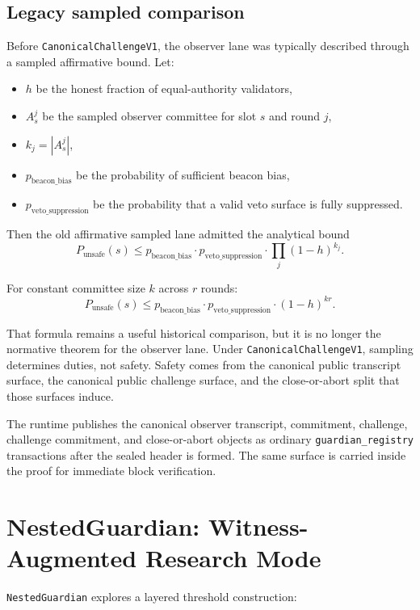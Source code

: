 \documentclass[11pt]{article}
\newcommand{\code}[1]{\texttt{#1}}
\begin{document}
\subsection{Legacy sampled comparison}

Before \code{CanonicalChallengeV1}, the observer lane was typically described
through a sampled affirmative bound. Let:

\begin{itemize}[leftmargin=1.5em]
\item \(h\) be the honest fraction of equal-authority validators,
\item \(A_s^j\) be the sampled observer committee for slot \(s\) and round
\(j\),
\item \(k_j = |A_s^j|\),
\item \(p_{\mathrm{beacon\_bias}}\) be the probability of sufficient beacon
bias,
\item \(p_{\mathrm{veto\_suppression}}\) be the probability that a valid veto
surface is fully suppressed.
\end{itemize}

Then the old affirmative sampled lane admitted the analytical bound
\[
P_{\mathrm{unsafe}}(s)
\le
p_{\mathrm{beacon\_bias}}
\cdot
p_{\mathrm{veto\_suppression}}
\cdot
\prod_j (1 - h)^{k_j}.
\]

For constant committee size \(k\) across \(r\) rounds:
\[
P_{\mathrm{unsafe}}(s)
\le
p_{\mathrm{beacon\_bias}}
\cdot
p_{\mathrm{veto\_suppression}}
\cdot
(1 - h)^{kr}.
\]

That formula remains a useful historical comparison, but it is no longer the
normative theorem for the observer lane. Under \code{CanonicalChallengeV1},
sampling determines duties, not safety. Safety comes from the canonical public
transcript surface, the canonical public challenge surface, and the
close-or-abort split that those surfaces induce.

The runtime publishes the canonical observer transcript, commitment, challenge,
challenge commitment, and close-or-abort objects as ordinary
\code{guardian\_registry} transactions after the sealed header is formed. The
same surface is carried inside the proof for immediate block verification.

\section{NestedGuardian: Witness-Augmented Research Mode}

\code{NestedGuardian} explores a layered threshold construction:
\end{document}
